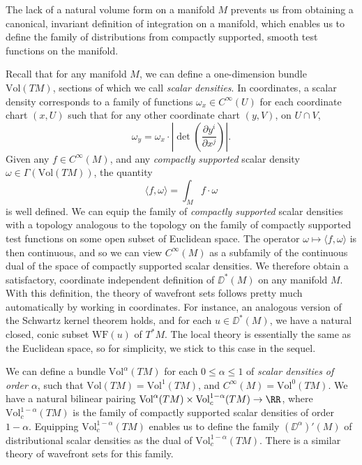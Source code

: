 The lack of a natural volume form on a manifold $M$ prevents us from obtaining a canonical, invariant definition of integration on a manifold, which enables us to define the family of distributions from compactly supported, smooth test functions on the manifold.

Recall that for any manifold $M$, we can define a one-dimension bundle $\text{Vol}(TM)$, sections of which we call \emph{scalar densities}. In coordinates, a scalar density corresponds to a family of functions $\omega_x \in C^\infty(U)$ for each coordinate chart $(x,U)$ such that for any other coordinate chart $(y,V)$, on $U \cap V$,
%
\[ \omega_y = \omega_x \cdot \left| \det \left( \frac{\partial y^i}{\partial x^j} \right) \right|. \]
%
Given any $f \in C^\infty(M)$, and any \emph{compactly supported} scalar density $\omega \in \Gamma(\text{Vol}(TM))$, the quantity
%
\[ \langle f, \omega \rangle = \int_M f \cdot \omega \]
%
is well defined. We can equip the family of \emph{compactly supported} scalar densities with a topology analogous to the topology on the family of compactly supported test functions on some open subset of Euclidean space. The operator $\omega \mapsto \langle f, \omega \rangle$ is then continuous, and so we can view $C^\infty(M)$ as a subfamily of the continuous dual of the space of compactly supported scalar densities. We therefore obtain a satisfactory, coordinate independent definition of $\DD^*(M)$ on any manifold $M$. With this definition, the theory of wavefront sets follows pretty much automatically by working in coordinates. For instance, an analogous version of the Schwartz kernel theorem holds, and for each $u \in \DD^*(M)$, we have a natural closed, conic subset $\text{WF}(u)$ of $T^*M$. The local theory is essentially the same as the Euclidean space, so for simplicity, we stick to this case in the sequel.

\begin{remark}
    We can define a bundle $\text{Vol}^\alpha(TM)$ for each $0 \leq \alpha \leq 1$ of \emph{scalar densities of order $\alpha$}, such that $\text{Vol}(TM) = \text{Vol}^1(TM)$, and $C^\infty(M) = \text{Vol}^0(TM)$. We have a natural bilinear pairing $\text{Vol}^\alpha(TM) \times \text{Vol}^{1-\alpha}_c(TM) \to \RR$, where $\text{Vol}^{1-\alpha}_c(TM)$ is the family of compactly supported scalar densities of order $1 - \alpha$. Equipping $\text{Vol}^{1-\alpha}_c(TM)$ enables us to define the family $(\DD^\alpha)'(M)$ of distributional scalar densities as the dual of $\text{Vol}^{1-\alpha}_c(TM)$. There is a similar theory of wavefront sets for this family.
\end{remark}

